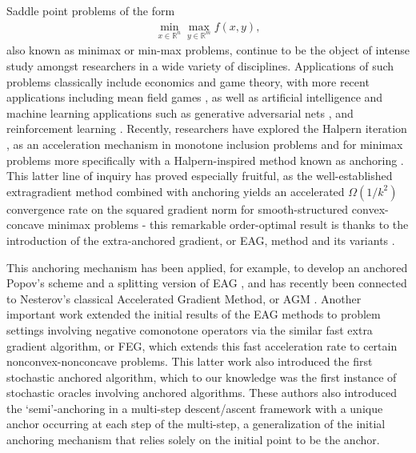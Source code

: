 \documentclass[11pt,reqno,oneside]{amsart}
\theoremstyle{definition}
\numberwithin{equation}{section}
\begin{document}
Saddle point problems of the form
\begin{align}
    \min_{x\in \mathbb{R}^{n}}\max_{y\in \mathbb{R}^{m}} f(x,y) \label{problem_setting},
\end{align}
also known as minimax or min-max problems, continue to be the object of intense study amongst researchers in a wide variety of disciplines.
Applications of such problems classically include economics and game theory, with more recent applications including mean field games \cite{nurbekyan2024monotoneinclusionmethodsclass}, as well as artificial intelligence and machine learning applications such as generative adversarial nets \cite{chavdarova2019reducing}, \cite{goodfellow2014generative} and reinforcement learning \cite{du2017stochastic}.
Recently, researchers have explored the Halpern iteration \cite{halpern1967fixed}, \cite{lieder2021convergence} as an acceleration mechanism in monotone inclusion problems \cite{diakonikolas2020halpern} and for minimax problems more specifically with a Halpern-inspired method known as anchoring \cite{ryu2019ode}.
This latter line of inquiry has proved especially fruitful, as the well-established extragradient method \cite{korpelevich1976extragradient} combined with anchoring yields an accelerated $\Omega(1/k^{2})$ convergence rate on the squared gradient norm for smooth-structured convex-concave minimax problems - this remarkable order-optimal result is thanks to the introduction of the extra-anchored gradient, or EAG, method and its variants \cite{yoon_ryu}.

This anchoring mechanism has been applied, for example, to develop an anchored Popov's scheme \cite{popov1980modification} and a splitting version of EAG \cite{tran2021halpern}, and has recently been connected \cite{tran2022connection} to Nesterov's classical Accelerated Gradient Method, or AGM \cite{nesterov1983method_AGM}.
Another important work \cite{lee2021fast} extended the initial results of the EAG methods to problem settings involving negative comonotone operators via the similar fast extra gradient algorithm, or FEG, which extends this fast acceleration rate to certain nonconvex-nonconcave problems.
This latter work also introduced the first stochastic anchored algorithm, which to our knowledge was the first instance of stochastic oracles involving anchored algorithms.
These authors also introduced the `semi'-anchoring \cite{lee2021semi} in a multi-step descent/ascent framework with a unique anchor occurring at each step of the multi-step, a generalization of the initial anchoring mechanism that relies solely on the initial point to be the anchor.
\end{document}
